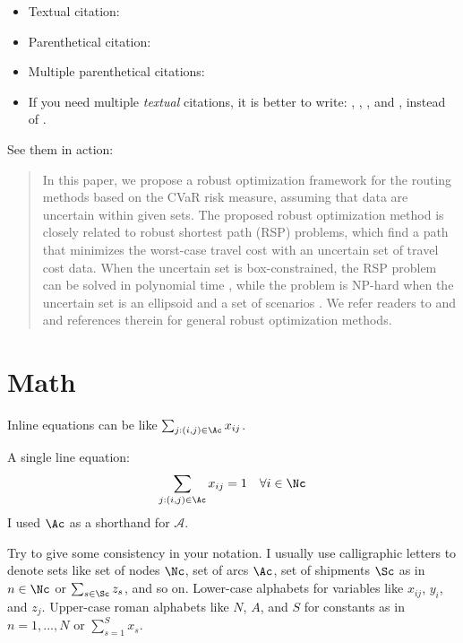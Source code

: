 \documentclass[letterpaper, 11pt]{article}
\begin{document}
\begin{itemize}
\item Textual citation: \citet{Kwon2013rsp}
\item Parenthetical citation: \citep{Kwon2013rsp}
\item Multiple parenthetical citations: \citep{Bertsimas2004,Chaerani2005,Kouvelis1996,gabrel2012recent}
\item If you need multiple \emph{textual} citations, it is better to write: \citet{Bertsimas2004}, \citet{Chaerani2005}, \citet{Kouvelis1996}, and \citet{gabrel2012recent}, instead of \citet{Bertsimas2004,Chaerani2005,Kouvelis1996,gabrel2012recent}.

\end{itemize}

See them in action:
\begin{quote}
In this paper, we propose a robust optimization framework for the routing methods based on the CVaR risk measure, assuming that data are uncertain within given sets. The proposed robust optimization method is closely related to robust shortest path (RSP) problems, which find a path that minimizes the worst-case travel cost with an uncertain set of travel cost data. When the uncertain set is box-constrained, the RSP problem can be solved in polynomial time \citep{Bertsimas2003network}, while the problem is NP-hard when the uncertain set is an ellipsoid \citep{Bertsimas2004,Chaerani2005} and a set of scenarios \citep{Kouvelis1996}. We refer readers to \citet{ben2009robust} and \citet{gabrel2012recent} and references therein for general robust optimization methods. 
\end{quote}




\section{Math} \label{sec:math}
Inline equations can be like $\sum_{j:(i,j)\in\Ac} x_{ij}$.

A single line equation:
\begin{equation}
	\sum_{j:(i,j)\in\Ac} x_{ij} = 1 \quad \forall i\in\Nc \label{node_constraint1}
\end{equation}
I used $\Ac$ as a shorthand for $\mathcal{A}$. 

Try to give some consistency in your notation. I usually use calligraphic letters to denote sets like set of nodes $\Nc$, set of arcs $\Ac$, set of shipments $\Sc$ as in $n\in\Nc$ or $\sum_{s\in\Sc} z_s$, and so on. Lower-case alphabets for variables like $x_{ij}$, $y_i$, and $z_j$. Upper-case roman alphabets like $N$, $A$, and $S$ for constants as in $n=1,...,N$ or $\sum_{s=1}^S x_s$. 
\end{document}
